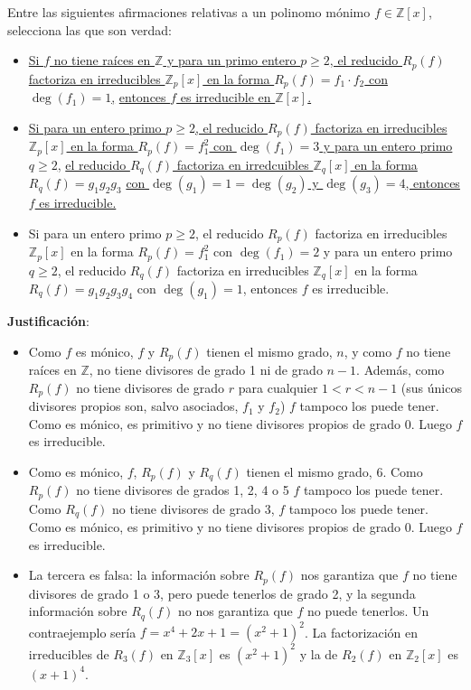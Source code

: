\begin{ejercicio}
    Entre las siguientes afirmaciones relativas a un polinomo mónimo $f\in \mathbb{Z}[x]$, selecciona las que son verdad:
    \begin{itemize}
    \item \underline{Si $f$ no tiene raíces en $\mathbb{Z}$ y para un primo entero $p\geq 2$, el reducido $R_p(f)$}\newline
        \underline{ factoriza en irreducibles $\mathbb{Z}_p[x]$ en la forma $R_p(f) = f_1 \cdot f_2$ con $\deg(f_1)=1$,}\newline
        \underline{entonces $f$ es irreducible en $\mathbb{Z}[x]$.}
\item \underline{Si para un entero primo $p\geq 2$, el reducido $R_p(f)$ factoriza en irreducibles}\newline
\underline{$\mathbb{Z}_p[x]$ en la forma $R_p(f) = f_1^2$ con $\deg(f_1)=3$ y para un entero primo $q\geq 2$,}\newline
\underline{el reducido $R_q(f)$ factoriza en irredcuibles $\mathbb{Z}_q[x]$ en la forma $R_q(f)=g_1g_2g_3$}\newline
\underline{ con $\deg(g_1)=1=\deg(g_2)$ y $\deg(g_3)=4$, entonces $f$ es irreducible.}
        \item Si para un entero primo $p\geq 2$, el reducido $R_p(f)$ factoriza en irreducibles $\mathbb{Z}_p[x]$ en la forma $R_p(f)=f_1^2$ con $\deg(f_1)=2$ y para un entero primo $q\geq 2$, el reducido $R_q(f)$ factoriza en irreducibles $\mathbb{Z}_q[x]$ en la forma $R_q(f)=g_1g_2g_3g_4$ con $\deg(g_1)=1$, entonces $f$ es irreducible.
    \end{itemize}

    \noindent
    \textbf{Justificación}:
    \begin{itemize}
        \item Como $f$ es mónico, $f$ y $R_p(f)$ tienen el mismo grado, $n$, y como $f$ no tiene raíces en $\mathbb{Z}$, no tiene divisores de grado 1 ni de grado $n-1$. Además, como $R_p(f)$ no tiene divisores de grado $r$ para cualquier $1<r<n-1$ (sus únicos divisores propios son, salvo asociados, $f_1$ y $f_2$) $f$ tampoco los puede tener. Como es mónico, es primitivo y no tiene divisores propios de grado 0. Luego $f$ es irreducible.
        \item Como es mónico, $f$, $R_p(f)$ y $R_q(f)$ tienen el mismo grado, 6. Como $R_p(f)$ no tiene divisores de grados 1, 2, 4 o 5 $f$ tampoco los puede tener. Como $R_q(f)$ no tiene divisores de grado 3, $f$ tampoco los puede tener. Como es mónico, es primitivo y no tiene divisores propios de grado 0. Luego $f$ es irreducible.
        \item La tercera es falsa: la información sobre $R_p(f)$ nos garantiza que $f$ no tiene divisores de grado 1 o 3, pero puede tenerlos de grado 2, y la segunda información sobre $R_q(f)$ no nos garantiza que $f$ no puede tenerlos. Un contraejemplo sería $f=x^4+2x+1={(x^2+1)}^{2}$. La factorización en irreducibles de $R_3(f)$ en $\mathbb{Z}_3[x]$ es ${(x^2+1)}^{2}$ y la de $R_2(f)$ en $\mathbb{Z}_2[x]$ es ${(x+1)}^{4}$.
    \end{itemize}
\end{ejercicio}

\newpage
\resetearcontador

